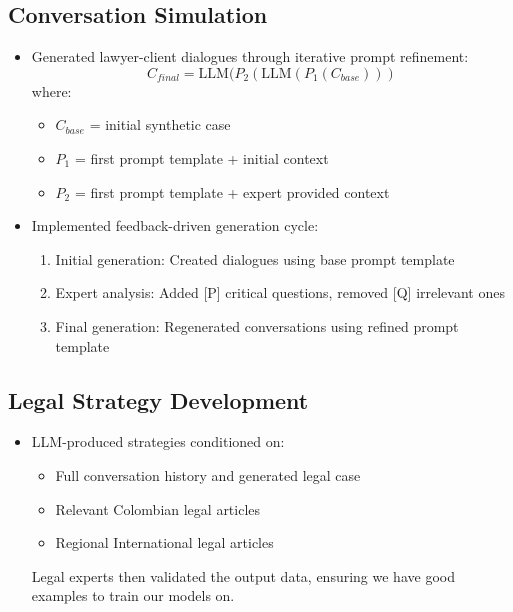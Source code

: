 \subsection{Conversation Simulation}
\begin{itemize}
    \item Generated lawyer-client dialogues through iterative prompt refinement:
    \begin{equation}
        C_{final} = \text{LLM}(P_2(\text{LLM}(P_1(C_{base})))
    \end{equation}
    where:
    \begin{itemize}
        \item $C_{base}$ = initial synthetic case
        \item $P_1$ = first prompt template + initial context
        \item $P_2$ = first prompt template + expert provided context
    \end{itemize}
    
    \item Implemented feedback-driven generation cycle:
    \begin{enumerate}
        \item Initial generation: Created dialogues using base prompt template
        \item Expert analysis: Added [P] critical questions, removed [Q] irrelevant ones
        \item Final generation: Regenerated conversations using refined prompt template
    \end{enumerate}
\end{itemize}

\subsection{Legal Strategy Development}
\begin{itemize}
    \item LLM-produced strategies conditioned on:
    \begin{itemize}
        \item Full conversation history and generated legal case
        \item Relevant Colombian legal articles
        \item Regional International legal articles
    \end{itemize}
    
    Legal experts then validated the output data, ensuring we have good
    examples to train our models on.
\end{itemize}

